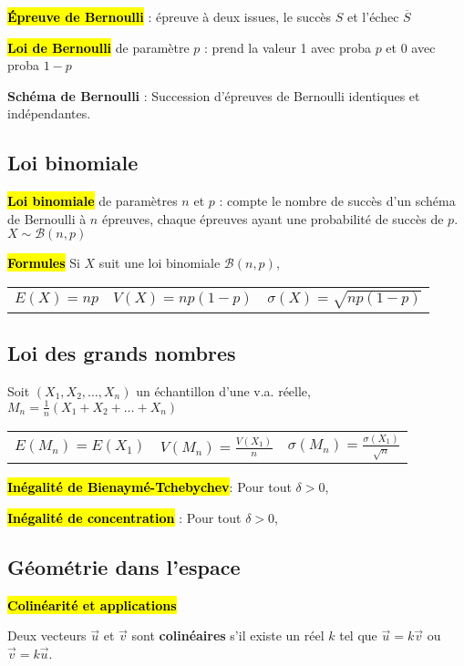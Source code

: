\documentclass[10pt,fleqn, openany, landscape, twocolumn]{book} %
\begin{document}
\hl{\textbf{Épreuve de Bernoulli}} : épreuve à deux issues, le succès $S$ et l'échec $\overline{S}$

\hl{\textbf{Loi de Bernoulli}} de paramètre $p$ : prend la valeur 1 avec proba $p$ et 0 avec proba $1-p$

\textbf{Schéma de Bernoulli} : Succession d'épreuves de Bernoulli identiques et indépendantes.

\subsection*{Loi binomiale}

\hl{\textbf{Loi binomiale}} de paramètres $n$ et $p$ : compte le nombre de succès d'un schéma de Bernoulli à $n$ épreuves, chaque épreuves ayant une probabilité de succès de $p$. $X\sim \mathcal{B}(n,p)$

\hl{\textbf{Formules}} Si $X$ suit une loi binomiale $\mathcal{B}(n,p)$, 
\begin{tabularx}{\linewidth}{XXX}
$E(X)=np$ & $V(X)=np(1-p)$ & $\sigma(X)=\sqrt{np(1-p)}$\end{tabularx}
\vspace{-0.5cm}
\subsection*{Loi des grands nombres}

Soit $(X_1, X_2, \dots, X_n)$ un échantillon d'une v.a. réelle, $M_n=\frac{1}{n}(X_1+X_2+\dots+X_n)$
\begin{tabularx}{\linewidth}{XXX}
$E(M_n)=E(X_1)$ & $V(M_n)=\frac{V(X_1)}{n}$ & $\sigma(M_n)=\frac{\sigma(X_1)}{\sqrt{n}}$\end{tabularx}

\hl{\textbf{Inégalité de Bienaymé-Tchebychev}}: Pour tout $\delta > 0$, 

\hl{\textbf{Inégalité de concentration}} : Pour tout $\delta > 0$, 

\subsection*{Géométrie dans l'espace}

\hl{\textbf{Colinéarité et applications}}

Deux vecteurs $\vec u$ et $\vec v$ sont \textbf{colinéaires} s'il existe un réel $k$ tel que $\vec u = k \vec v$ ou $\vec v = k \vec u$.
\end{document}
